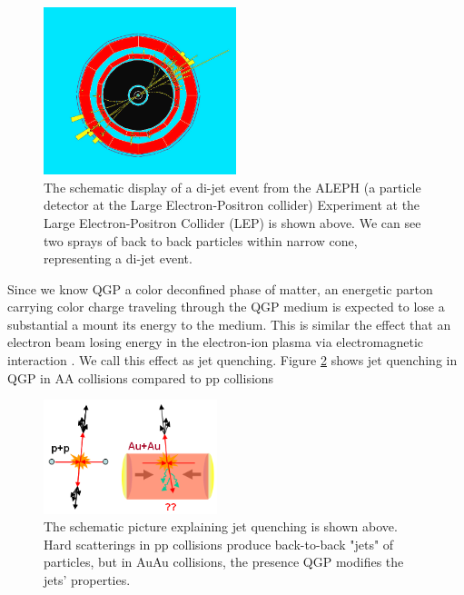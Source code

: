 \begin{figure}[hbtp]
\begin{center}
\includegraphics[width=0.50\textwidth]{Figures/Chapter1/DijetEvt.png}
\caption{The schematic display of a di-jet event from the ALEPH (a particle detector at the Large Electron-Positron collider) Experiment at the Large Electron-Positron Collider (LEP) is shown above. We can see two sprays of back to back particles within narrow cone, representing a di-jet event.}
\label{dijet}
\end{center}
\end{figure} 


Since we know QGP a color deconfined phase of matter, an energetic parton carrying color charge traveling through the QGP medium is expected to lose a substantial a mount its energy to the medium. This is similar the effect that an electron beam losing energy in the electron-ion plasma via electromagnetic interaction \cite{}. We call this effect as jet quenching. Figure \ref{JetELoss} shows jet quenching in QGP in AA collisions compared to pp collisions

\begin{figure}[hbtp]
\begin{center}
\includegraphics[width=0.45\textwidth]{Figures/Chapter1/JetELoss.png}
\caption{The schematic picture explaining jet quenching is shown above. Hard scatterings in pp collisions produce back-to-back "jets" of particles, but in AuAu collisions, the presence QGP modifies the jets' properties.}
\label{JetELoss}
\end{center}
\end{figure} 


